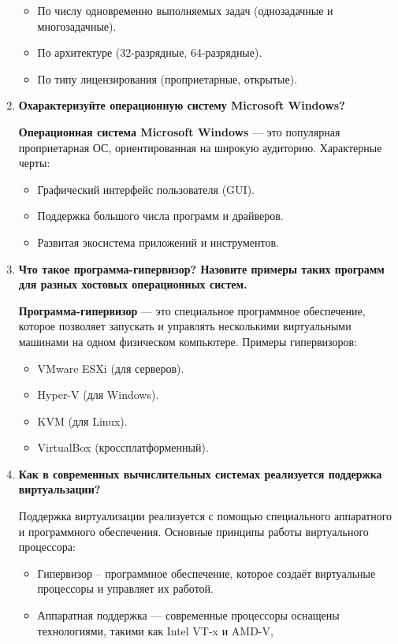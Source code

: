 \begin{enumerate}
\begin{itemize}
			\item По числу одновременно выполняемых задач
				(однозадачные и многозадачные).
			\item По архитектуре (32-разрядные, 64-разрядные).
			\item По типу лицензирования (проприетарные, открытые).
		\end{itemize}
	\item \textbf{Охарактеризуйте операционную систему Microsoft Windows?}\par
		\textbf{Операционная система Microsoft Windows} --- это популярная
		проприетарная ОС, ориентированная на широкую аудиторию.
		Характерные черты:
		\begin{itemize}
			\item Графический интерфейс пользователя (GUI).
			\item Поддержка большого числа программ и драйверов.
			\item Развитая экосистема приложений и инструментов.
		\end{itemize}
	\item \textbf{Что такое программа-гипервизор?
			Назовите примеры таких программ для разных хостовых
			операционных систем.}\par
		\textbf{Программа-гипервизор} --- это специальное программное
		обеспечение, которое позволяет запускать
		и управлять несколькими виртуальными машинами
		на одном физическом компьютере.
		Примеры гипервизоров:
		\begin{itemize}
			\item VMware ESXi (для серверов).
			\item Hyper-V (для Windows).
			\item KVM (для Linux).
			\item VirtualBox (кроссплатформенный).
		\end{itemize}
	\item \textbf{Как в современных вычислительных системах реализуется
		поддержка виртуальзации?}\par
		Поддержка виртуализации реализуется
		с помощью специального аппаратного и программного обеспечения.
		Основные принципы работы виртуального процессора:
		\begin{itemize}
			\item Гипервизор -- программное обеспечение,
				которое создаёт виртуальные процессоры и управляет их работой.
			\item Аппаратная поддержка --- современные процессоры оснащены
				технологиями, такими как Intel VT-x и AMD-V,

\end{itemize}
\end{enumerate}
